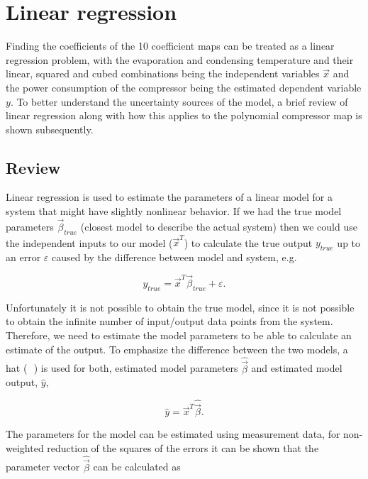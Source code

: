 \section{Linear regression}
\label{sec:linear_regression}
Finding the coefficients of the 10 coefficient maps can be treated as a linear regression problem, with the evaporation and condensing temperature and their linear, squared and cubed combinations being the independent variables ${\vec x}$ and the power consumption of the compressor being the estimated dependent variable $y$. To better understand the uncertainty sources of the model, a brief review of linear regression along with how this applies to the polynomial compressor map is shown subsequently.

\subsection{Review}
\label{sec:linreg_review}
Linear regression is used to estimate the parameters of a linear model for a system that might have slightly nonlinear behavior.  If we had the true model parameters ${\vec \beta _{true}} $ (closest model to describe the actual system) then we could use the independent inputs to our model (${\vec x^T}$) to calculate the true output $y_{true}$ up to an error $\varepsilon$ caused by the difference between model and system, e.g.

\begin{equation}
{y_{true}} = {\vec x^T}{\vec \beta _{true}} + \varepsilon.
\label{eq:true_lin_model}
\end{equation}

Unfortunately it is not possible to obtain the true model, since it is not possible to obtain the infinite number of input/output data points from the system. Therefore, we need to estimate the model parameters to be able to calculate an estimate of the output. To emphasize the difference between the two models, a hat ( $\hat{}$ ) is used for both, estimated model parameters $\hat {\vec \beta}$ and estimated model output, $\hat y$,

\begin{equation}
\hat y = {\vec x^T}\hat {\vec \beta}.
\label{eq:estimted_lin_model}
\end{equation}

The parameters for the model can be estimated using measurement data, for non-weighted reduction of the squares of the errors it can be shown that the  parameter vector $\hat {\vec \beta}$ can be calculated as

